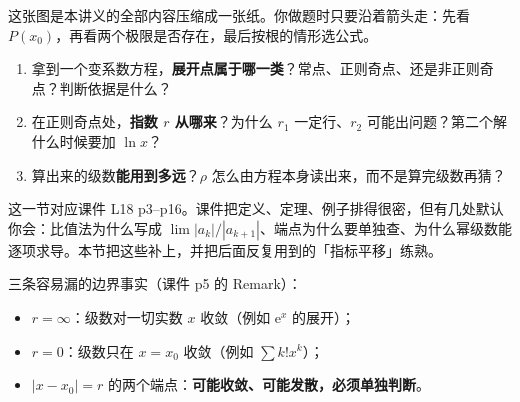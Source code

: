 \documentclass[11pt]{ctexart}
\let\orighdr\hdr
\renewcommand{\hdr}[2]{\needspace{6\baselineskip}\orighdr{#1}{#2}}
\let\origsubhdr\subhdr
\renewcommand{\subhdr}[1]{\needspace{3\baselineskip}\origsubhdr{#1}}
\newcommand{\ee}{\mathrm{e}}
\begin{document}
这张图是本讲义的全部内容压缩成一张纸。你做题时只要沿着箭头走：先看 $P(x_0)$，再看两个极限是否存在，最后按根的情形选公式。


\begin{enumerate}
  \item 拿到一个变系数方程，\textbf{展开点属于哪一类}？常点、正则奇点、还是非正则奇点？判断依据是什么？
  \item 在正则奇点处，\textbf{指数 $r$ 从哪来}？为什么 $r_1$ 一定行、$r_2$ 可能出问题？第二个解什么时候要加 $\ln x$？
  \item 算出来的级数\textbf{能用到多远}？$\rho$ 怎么由方程本身读出来，而不是算完级数再猜？
\end{enumerate}


这一节对应课件 L18 p3--p16。课件把定义、定理、例子排得很密，但有几处默认你会：比值法为什么写成 $\lim|a_k|/|a_{k+1}|$、端点为什么要单独查、为什么幂级数能逐项求导。本节把这些补上，并把后面反复用到的「指标平移」练熟。



三条容易漏的边界事实（课件 p5 的 Remark）：
\begin{itemize}
  \item $r=\infty$：级数对一切实数 $x$ 收敛（例如 $\ee^x$ 的展开）；
  \item $r=0$：级数只在 $x=x_0$ 收敛（例如 $\sum k!x^k$）；
  \item $|x-x_0|=r$ 的两个端点：\textbf{可能收敛、可能发散，必须单独判断}。
\end{itemize}


\end{document}
